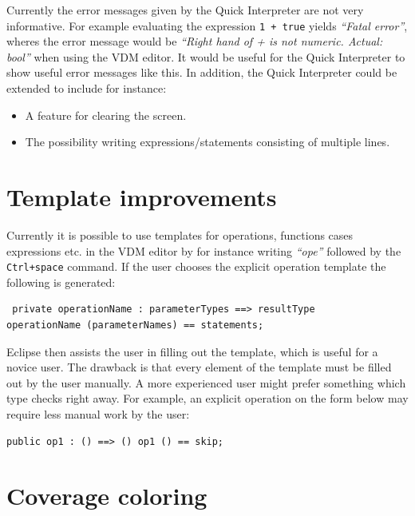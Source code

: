 \documentclass[11pt]{overturerep} \usepackage{t1enc,times,a4,t1enc}
\begin{document}
Currently the error messages given by the Quick Interpreter are not very
informative. For example evaluating the expression \texttt{1 + true} yields
\textit{``Fatal error''}, wheres the error message would be \textit{``Right
hand of + is not numeric. Actual: bool''} when using the VDM editor. It would
be useful for the Quick Interpreter to show useful error messages like this. In
addition, the Quick Interpreter could be extended to include for instance:

\begin{itemize}

\item A feature for clearing the screen.

\item The possibility writing expressions/statements consisting of multiple
    lines.

\end{itemize}


\section{Template improvements}

Currently it is possible to use templates for operations, functions cases
expressions etc. in the VDM editor by for instance writing \textit{``ope''}
followed by the \texttt{Ctrl+space} command. If the user chooses the explicit
operation template the following is generated:

\begin{lstlisting} private operationName : parameterTypes ==> resultType
operationName (parameterNames) == statements; \end{lstlisting}

Eclipse then assists the user in filling out the template, which is useful for
a novice user. The drawback is that every element of the template must be
filled out by the user manually. A more experienced user might prefer something
which type checks right away. For example, an explicit operation on the form
below may require less manual work by the user:

\begin{lstlisting} 
public op1 : () ==> () op1 () == skip; 
\end{lstlisting}


\section{Coverage coloring}
\end{document}
